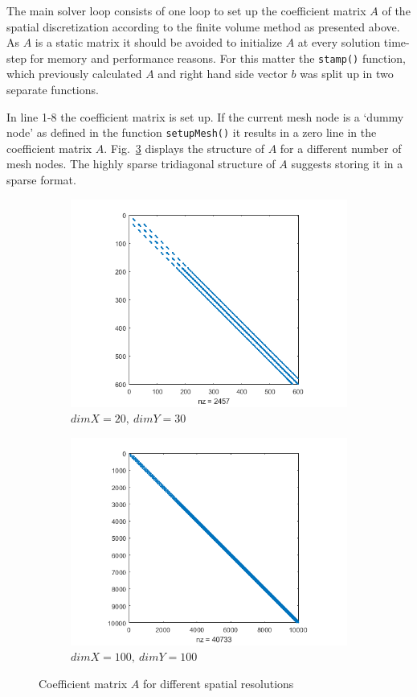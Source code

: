 \documentclass[fleqn,12pt]{NTFD} %
\begin{document}
The main solver loop consists of one loop to set up the coefficient matrix $A$ of the spatial discretization according to the finite volume method as presented above. As $A$ is a static matrix it should be avoided to initialize $A$ at every solution time-step for memory and performance reasons. For this matter the \texttt{stamp()} function, which previously calculated $A$ and right hand side vector $b$ was split up in two separate functions. 

In line 1-8 the coefficient matrix is set up. If the current mesh node is a `dummy node' as defined in the function \texttt{setupMesh()} it results in a zero line in the coefficient matrix $A$. Fig.~\ref{fig:matrix structure} displays the structure of $A$ for a different number of mesh nodes. The highly sparse tridiagonal structure of $A$ suggests storing it in a sparse format.


\begin{figure}
\centering
\begin{subfigure}{.5\textwidth}
  \centering
  \includegraphics[width=.8\linewidth]{matrixA2030.png}
  \caption{$dimX = 20, \ dimY = 30$}
  \label{fig:A2030}
\end{subfigure}%
\begin{subfigure}{.5\textwidth}
  \centering
  \includegraphics[width=.8\linewidth]{matrixA100100.png}
  \caption{$dimX = 100, \ dimY = 100$}
  \label{fig:sub2}
\end{subfigure}
\caption{Coefficient matrix $A$ for different spatial resolutions}
\label{fig:matrix structure}
\end{figure}
\end{document}
